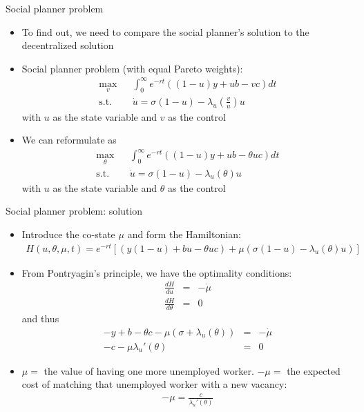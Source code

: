 \documentclass[9pt]{beamer}
\newcommand{\bit}{\begin{itemize}}
\newcommand{\eit}{\end{itemize}}
\begin{document}
\begin{frame}{Social planner problem}

\bit
\setlength\itemsep{1.5em}

\item To find out, we need to compare the social planner's solution to the decentralized solution

\item Social planner problem (with equal Pareto weights):
\begin{eqnarray}
\max_{v} && \int_{0}^{\infty} e^{-rt}\left((1-u)y + ub- v c \right) dt \nonumber \\
\text{s.t.} &&  \dot{u} = \sigma (1-u) - \lambda_u(\frac{v}{u})u \nonumber 
\end{eqnarray}
with $u$ as the state variable and $v$ as the control

\item We can reformulate as
\begin{eqnarray}
\max_{\theta} && \int_{0}^{\infty} e^{-rt}\left((1-u)y + ub-\theta u c \right) dt \nonumber \\
\text{s.t.} &&  \dot{u} = \sigma (1-u) - \lambda_u(\theta)u \nonumber 
\end{eqnarray}
with $u$ as the state variable and $\theta$ as the control



\eit
\end{frame}

\begin{frame}{Social planner problem: solution}

\bit
\setlength\itemsep{1em}


\item Introduce the co-state $\mu$ and form the Hamiltonian:
\begin{eqnarray}
H(u, \theta, \mu, t) = e^{-rt}\left[ (y(1-u) +bu - \theta u c ) + \mu (\sigma (1-u) - \lambda_u(\theta)u)  \right] \nonumber
\end{eqnarray}

\item From Pontryagin's principle, we have the optimality conditions:
\begin{eqnarray}
\frac{d H}{d u} &=& -\dot \mu \nonumber \\
\frac{d H}{d \theta} &=& 0 \nonumber
\end{eqnarray}
and thus
\begin{eqnarray}
 -y +b - \theta c - \mu (\sigma + \lambda_u(\theta)) &=& -\dot \mu \nonumber \\
-c - \mu \lambda_u'(\theta) &=& 0 \nonumber 
\end{eqnarray}

\item $\mu = $ the value of having one more unemployed worker. $-\mu = $ the expected cost of matching that unemployed worker with a new vacancy:
\begin{eqnarray}
-\mu = \frac{c}{\lambda_u'(\theta)} \nonumber
\end{eqnarray}

\eit
\end{frame}
\end{document}
